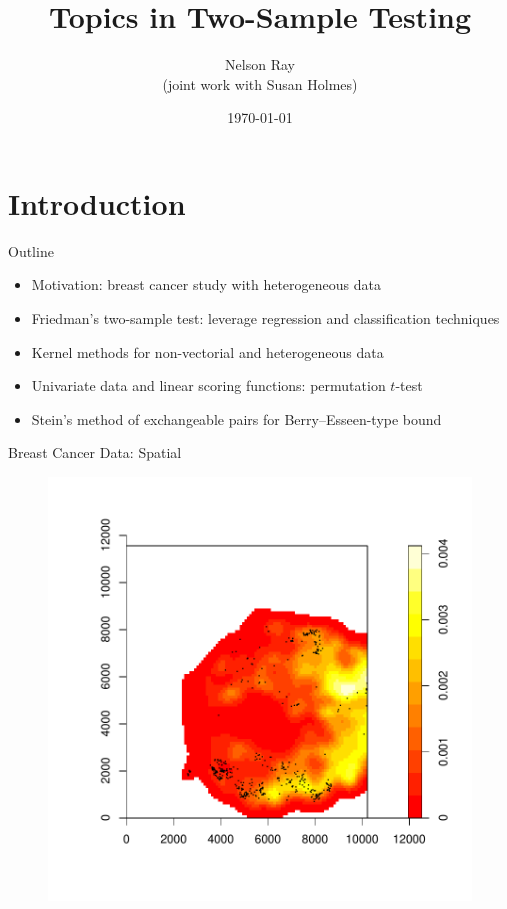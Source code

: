 \documentclass{beamer}
\begin{document}
\title[Topics in Two-Sample Testing]{Topics in Two-Sample Testing}
\author[N. Ray with S. Holmes]{Nelson Ray \\
  (joint work with Susan Holmes)}
\date{\today}

\begin{frame}
  \titlepage
\end{frame}


\section{Introduction}
\begin{frame}{Outline}
  \begin{itemize}
  \item Motivation: breast cancer study with heterogeneous data \pause
  \item Friedman's two-sample test:
    leverage regression and classification techniques \pause
  \item Kernel methods for non-vectorial and heterogeneous data \pause
  \item Univariate data and linear scoring functions: permutation
    $t$-test \pause
  \item Stein's method of exchangeable pairs for Berry--Esseen-type bound
  \end{itemize}
\end{frame}

\begin{frame}{Breast Cancer Data: Spatial}
  \begin{figure}
    \centering
    \includegraphics[scale=.5]{Fig2healthyDC.pdf}
  \end{figure}
\end{frame}
\end{document}
